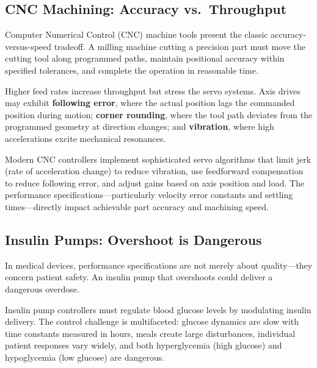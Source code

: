 \subsection{CNC Machining: Accuracy vs.\ Throughput}

Computer Numerical Control (CNC) machine tools present the classic accuracy-versus-speed tradeoff. A milling machine cutting a precision part must move the cutting tool along programmed paths, maintain positional accuracy within specified tolerances, and complete the operation in reasonable time.

Higher feed rates increase throughput but stress the servo systems. Axis drives may exhibit \textbf{following error}, where the actual position lags the commanded position during motion; \textbf{corner rounding}, where the tool path deviates from the programmed geometry at direction changes; and \textbf{vibration}, where high accelerations excite mechanical resonances.

Modern CNC controllers implement sophisticated servo algorithms that limit jerk (rate of acceleration change) to reduce vibration, use feedforward compensation to reduce following error, and adjust gains based on axis position and load. The performance specifications---particularly velocity error constants and settling times---directly impact achievable part accuracy and machining speed.

\subsection{Insulin Pumps: Overshoot is Dangerous}

\begin{warningbox}
In medical devices, performance specifications are not merely about quality---they concern patient safety. An insulin pump that overshoots could deliver a dangerous overdose.
\end{warningbox}

Insulin pump controllers must regulate blood glucose levels by modulating insulin delivery. The control challenge is multifaceted: glucose dynamics are slow with time constants measured in hours, meals create large disturbances, individual patient responses vary widely, and both hyperglycemia (high glucose) and hypoglycemia (low glucose) are dangerous.

